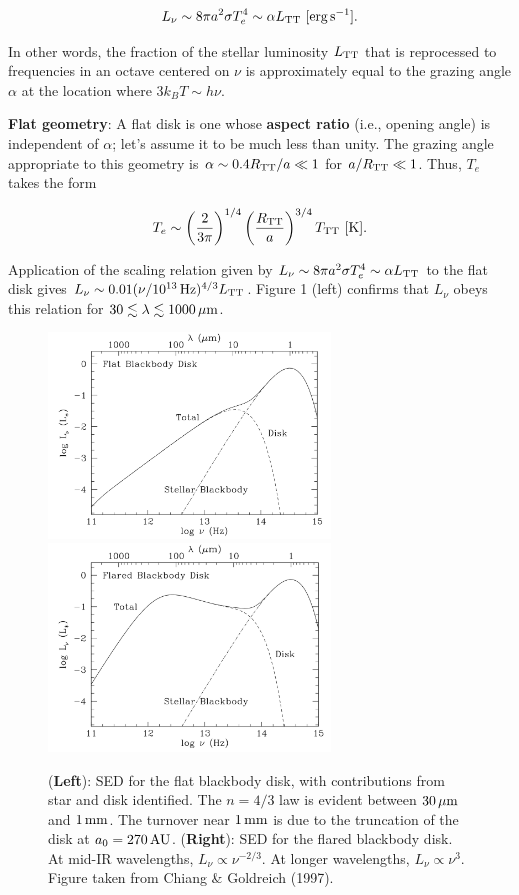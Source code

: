 \documentclass[a4paper,10pt]{article}
\begin{document}
\begin{align*}
    L_\nu \sim 8\pi a^2 \sigma T_e^4 \sim \alpha L_{\rm TT} ~ [{\rm erg\,s^{-1}}].
\end{align*}

{\noindent}In other words, the fraction of the stellar luminosity $L_{\rm TT}$ that is reprocessed to frequencies in an octave centered on $\nu$ is approximately equal to the grazing angle $\alpha$ at the location where $3k_BT\sim h\nu$.

{\noindent}\textbf{Flat geometry}: A flat disk is one whose \textbf{aspect ratio} (i.e., opening angle) is independent of $\alpha$; let's assume it to be much less than unity. The grazing angle appropriate to this geometry is $\alpha\sim0.4R_{\rm TT}/a\ll1$ for $a/R_{\rm TT}\ll1$. Thus, $T_e$ takes the form

\begin{align*}
    T_e \sim \left(\frac{2}{3\pi}\right)^{1/4} \left(\frac{R_{\rm TT}}{a}\right)^{3/4} T_{\rm TT} ~ [{\rm K}].
\end{align*}

{\noindent}Application of the scaling relation given by $L_\nu \sim 8\pi a^2 \sigma T_e^4 \sim \alpha L_{\rm TT}$ to the flat disk gives $L_\nu\sim0.01(\nu/10^{13}\,{\rm Hz})^{4/3}L_{\rm TT}$. Figure 1 (left) confirms that $L_\nu$ obeys this relation for $30\lesssim\lambda\lesssim1000\,\mu{\rm m}$.

\begin{figure}[t]
    \centering
    \includegraphics[width=7.5cm]{figures/TT_SED_flat.png}
    \includegraphics[width=7.5cm]{figures/TT_SED_flared.png}
    \caption{\footnotesize{(\textbf{Left}): SED for the flat blackbody disk, with contributions from star and disk identified. The $n=4/3$ law is evident between $30\,\mu{\rm m}$ and $1\,{\rm mm}$. The turnover near $1\,{\rm mm}$ is due to the truncation of the disk at $a_0=270\,{\rm AU}$. (\textbf{Right}): SED for the flared blackbody disk. At mid-IR wavelengths, $L_\nu\propto\nu^{-2/3}$. At longer wavelengths, $L_\nu\propto\nu^3$. Figure taken from Chiang \& Goldreich (1997).}}
    \label{fig:ttsed}
\end{figure}
\end{document}
